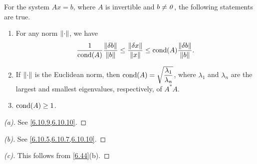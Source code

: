 \begin{thm}\label{6.44}
  For the system \(Ax = b\), where \(A\) is invertible and \(b \neq \mathit{0}\), the following statements are true.
  \begin{enumerate}
    \item For any norm \(\left\lVert\cdot\right\rVert\), we have
          \[
            \dfrac{1}{\cond{A}} \dfrac{\norm{\delta b}}{\norm{b}} \leq \dfrac{\norm{\delta x}}{\norm{x}} \leq \cond{A} \dfrac{\norm{\delta b}}{\norm{b}}.
          \]
    \item If \(\left\lVert\cdot\right\rVert\) is the Euclidean norm, then \(\cond{A} = \sqrt{\dfrac{\lambda_1}{\lambda_n}}\), where \(\lambda_1\) and \(\lambda_n\) are the largest and smallest eigenvalues, respectively, of \(A^* A\).
    \item \(\cond{A} \geq 1\).
  \end{enumerate}
\end{thm}

\begin{proof}[(a)]
  See \cref{6.10.9,6.10.10}.
\end{proof}

\begin{proof}[(b)]
  See \cref{6.10.5,6.10.7,6.10.10}.
\end{proof}

\begin{proof}[(c)]
  This follows from \cref{6.44}(b).
\end{proof}

